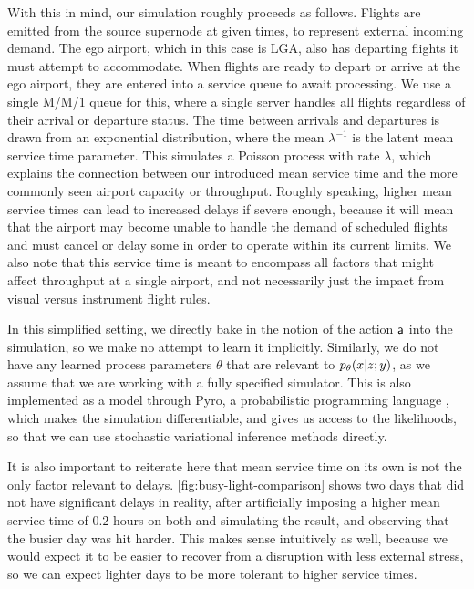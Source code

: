 With this in mind, our simulation roughly proceeds as follows. Flights are emitted from the source supernode at given times, to represent external incoming demand. The ego airport, which in this case is LGA, also has departing flights it must attempt to accommodate. When flights are ready to depart or arrive at the ego airport, they are entered into a service queue to await processing. We use a single M/M/1 queue for this, where a single server handles all flights regardless of their arrival or departure status. The time between arrivals and departures is drawn from an exponential distribution, where the mean $\lambda^{-1}$ is the latent mean service time parameter. This simulates a Poisson process with rate $\lambda$, which explains the connection between our introduced mean service time and the more commonly seen airport capacity or throughput. Roughly speaking, higher mean service times can lead to increased delays if severe enough, because it will mean that the airport may become unable to handle the demand of scheduled flights and must cancel or delay some in order to operate within its current limits. We also note that this service time is meant to encompass all factors that might affect throughput at a single airport, and not necessarily just the impact from visual versus instrument flight rules.

In this simplified setting, we directly bake in the notion of the action $\mathsf a$ into the simulation, so we make no attempt to learn it implicitly. Similarly, we do not have any learned process parameters $\theta$ that are relevant to $\pld{x\given z;y}$, as we assume that we are working with a fully specified simulator. This is also implemented as a model through Pyro, a probabilistic programming language \cite{bingham2019pyro}, which makes the simulation differentiable, and gives us access to the likelihoods, so that we can use stochastic variational inference methods directly.

It is also important to reiterate here that mean service time on its own is not the only factor relevant to delays. \cref{fig:busy-light-comparison} shows two days that did not have significant delays in reality, after artificially imposing a higher mean service time of $0.2$ hours on both and simulating the result, and observing that the busier day was hit harder. This makes sense intuitively as well, because we would expect it to be easier to recover from a disruption with less external stress, so we can expect lighter days to be more tolerant to higher service times.

